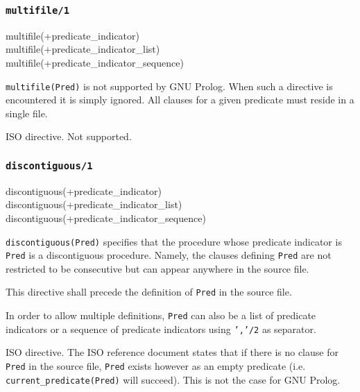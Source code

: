 \subsubsection{\texttt{multifile/1}}

\begin{TemplatesOneCol}
multifile(+predicate\_indicator)\\
multifile(+predicate\_indicator\_list)\\
multifile(+predicate\_indicator\_sequence)

\end{TemplatesOneCol}

\Description

\texttt{multifile(Pred)} is not supported by GNU Prolog.
When such a directive is encountered it is simply ignored. All clauses for a
given predicate must reside in a single file.

\Portability

ISO directive. Not supported.

\subsubsection{\texttt{discontiguous/1}}

\begin{TemplatesOneCol}
discontiguous(+predicate\_indicator)\\
discontiguous(+predicate\_indicator\_list)\\
discontiguous(+predicate\_indicator\_sequence)

\end{TemplatesOneCol}

\Description

\texttt{discontiguous(Pred)} specifies that the procedure whose predicate
indicator is \texttt{Pred} is a discontiguous procedure. Namely, the clauses
defining \texttt{Pred} are not restricted to be consecutive but can appear
anywhere in the source file.

This directive shall precede the definition of \texttt{Pred} in the source
file.

In order to allow multiple definitions, \texttt{Pred} can also be a list of
predicate indicators or a sequence of predicate indicators using
\texttt{','/2} as separator.

\Portability

ISO directive. The ISO reference document states that if there is no clause
for \texttt{Pred} in the source file, \texttt{Pred} exists however as an
empty predicate (i.e. \texttt{current\_predicate(Pred)} will succeed). This
is not the case for GNU Prolog.

